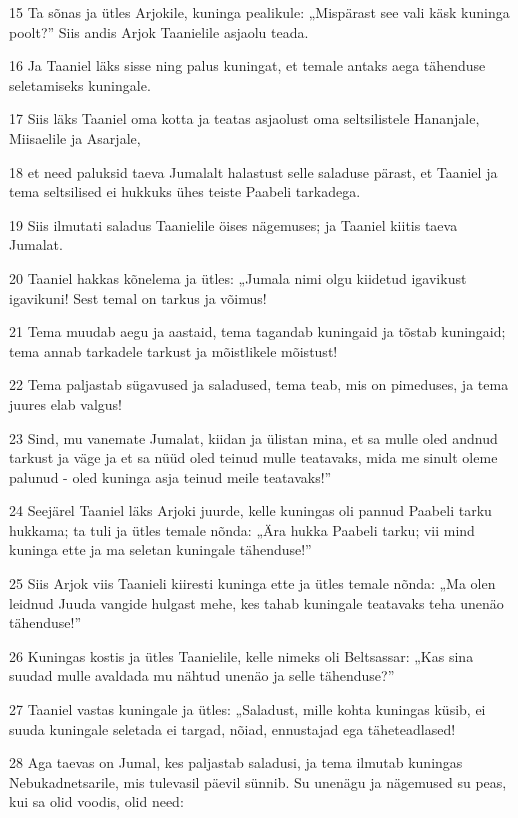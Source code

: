 \par 15 Ta sõnas ja ütles Arjokile, kuninga pealikule: „Mispärast see vali käsk kuninga poolt?” Siis andis Arjok Taanielile asjaolu teada.
\par 16 Ja Taaniel läks sisse ning palus kuningat, et temale antaks aega tähenduse seletamiseks kuningale.
\par 17 Siis läks Taaniel oma kotta ja teatas asjaolust oma seltsilistele Hananjale, Miisaelile ja Asarjale,
\par 18 et need paluksid taeva Jumalalt halastust selle saladuse pärast, et Taaniel ja tema seltsilised ei hukkuks ühes teiste Paabeli tarkadega.
\par 19 Siis ilmutati saladus Taanielile öises nägemuses; ja Taaniel kiitis taeva Jumalat.
\par 20 Taaniel hakkas kõnelema ja ütles: „Jumala nimi olgu kiidetud igavikust igavikuni! Sest temal on tarkus ja võimus!
\par 21 Tema muudab aegu ja aastaid, tema tagandab kuningaid ja tõstab kuningaid; tema annab tarkadele tarkust ja mõistlikele mõistust!
\par 22 Tema paljastab sügavused ja saladused, tema teab, mis on pimeduses, ja tema juures elab valgus!
\par 23 Sind, mu vanemate Jumalat, kiidan ja ülistan mina, et sa mulle oled andnud tarkust ja väge ja et sa nüüd oled teinud mulle teatavaks, mida me sinult oleme palunud - oled kuninga asja teinud meile teatavaks!”
\par 24 Seejärel Taaniel läks Arjoki juurde, kelle kuningas oli pannud Paabeli tarku hukkama; ta tuli ja ütles temale nõnda: „Ära hukka Paabeli tarku; vii mind kuninga ette ja ma seletan kuningale tähenduse!”
\par 25 Siis Arjok viis Taanieli kiiresti kuninga ette ja ütles temale nõnda: „Ma olen leidnud Juuda vangide hulgast mehe, kes tahab kuningale teatavaks teha unenäo tähenduse!”
\par 26 Kuningas kostis ja ütles Taanielile, kelle nimeks oli Beltsassar: „Kas sina suudad mulle avaldada mu nähtud unenäo ja selle tähenduse?”
\par 27 Taaniel vastas kuningale ja ütles: „Saladust, mille kohta kuningas küsib, ei suuda kuningale seletada ei targad, nõiad, ennustajad ega täheteadlased!
\par 28 Aga taevas on Jumal, kes paljastab saladusi, ja tema ilmutab kuningas Nebukadnetsarile, mis tulevasil päevil sünnib. Su unenägu ja nägemused su peas, kui sa olid voodis, olid need:
